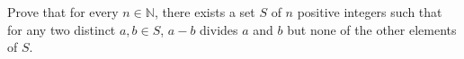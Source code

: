 Prove that for every $n\in \mathbb N$, there exists a set $S$ of $n$ positive integers such that for any two distinct $a,b\in S$, $a-b$ divides $a$ and $b$ but none of the other elements of $S$.